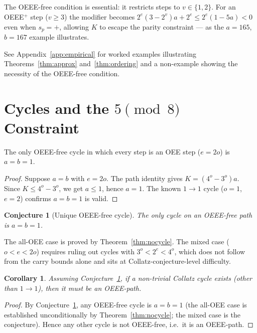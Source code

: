 \documentclass[11pt]{article}
\newtheorem{conjecture}{Conjecture}
\newtheorem{corollary}{Corollary}
\begin{document}
The OEEE-free condition is essential: it restricts steps to $v \in \{1,2\}$.
For an OEEE$^+$ step ($v \geq 3$) the modifier becomes
$2^e(3 - 2^v)a + 2^e \leq 2^e(1-5a) < 0$ even when $s_p = +$,
allowing $K$ to escape the parity constraint — as the $a=165$, $b=167$
example illustrates.

See Appendix~\ref{app:empirical} for worked examples illustrating
Theorems~\ref{thm:approx} and~\ref{thm:ordering} and a non-example showing
the necessity of the OEEE-free condition.

\section{Cycles and the $5\pmod{8}$ Constraint}

\begin{theorem}
\label{thm:nocycle}
The only OEEE-free cycle in which every step is an OEE step ($e = 2o$) is $a = b = 1$.
\end{theorem}

\begin{proof}
Suppose $a = b$ with $e = 2o$.  The path identity gives $K = (4^o - 3^o)a$.
Since $K \leq 4^o - 3^o$, we get $a \leq 1$, hence $a = 1$.  The known
$1\to 1$ cycle ($o=1$, $e=2$) confirms $a = b = 1$ is valid.
\end{proof}

\begin{conjecture}[Unique OEEE-free cycle]
\label{conj:nocycle}
The only cycle on an OEEE-free path is $a = b = 1$.
\end{conjecture}

The all-OEE case is proved by Theorem~\ref{thm:nocycle}.  The mixed case
($o < e < 2o$) requires ruling out cycles with $3^o < 2^e < 4^o$, which
does not follow from the carry bounds alone and sits at
Collatz-conjecture-level difficulty.

\begin{corollary}
\label{cor:oeee-path}
Assuming Conjecture~\ref{conj:nocycle}, if a non-trivial Collatz cycle
exists (other than $1\to 1$), then it must be an OEEE-path.
\end{corollary}

\begin{proof}
By Conjecture~\ref{conj:nocycle}, any OEEE-free cycle is $a = b = 1$
(the all-OEE case is established unconditionally by Theorem~\ref{thm:nocycle};
the mixed case is the conjecture).  Hence any other cycle is not OEEE-free,
i.e.\ it is an OEEE-path.
\end{proof}
\end{document}
